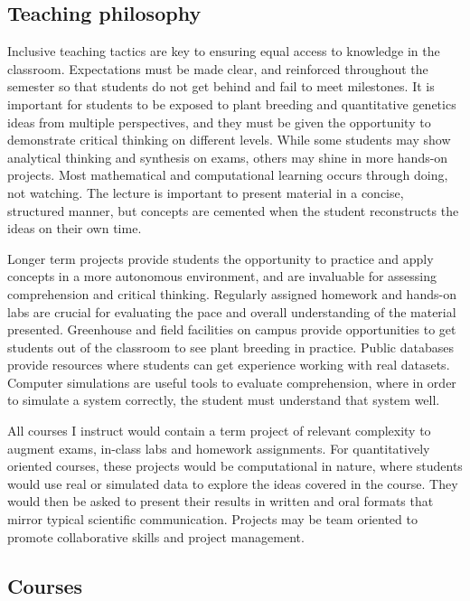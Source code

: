 \documentclass[11pt]{article}
\begin{document}
\subsection*{Teaching philosophy}

Inclusive teaching tactics are key to ensuring equal access to knowledge in the classroom. Expectations must be made clear, and reinforced throughout the semester so that students do not get behind and fail to meet milestones. It is important for students to be exposed to plant breeding and quantitative genetics ideas from multiple perspectives, and they must be given the opportunity to demonstrate critical thinking on different levels. While some students may show analytical thinking and synthesis on exams, others may shine in more hands-on projects. Most mathematical and computational learning occurs through doing, not watching. The lecture is important to present material in a concise, structured manner, but concepts are cemented when the student reconstructs the ideas on their own time.

Longer term projects provide students the opportunity to practice and apply concepts in a more autonomous environment, and are invaluable for assessing comprehension and critical thinking. Regularly assigned homework and hands-on labs are crucial for evaluating the pace and overall understanding of the material presented. Greenhouse and field facilities on campus provide opportunities to get students out of the classroom to see plant breeding in practice. Public databases provide resources where students can get experience working with real datasets. Computer simulations are useful tools to evaluate comprehension, where in order to simulate a system correctly, the student must understand that system well.

All courses I instruct would contain a term project of relevant complexity to augment exams, in-class labs and homework assignments. For quantitatively oriented courses, these projects would be computational in nature, where students would use real or simulated data to explore the ideas covered in the course. They would then be asked to present their results in written and oral formats that mirror typical scientific communication. Projects may be team oriented to promote collaborative skills and project management.

\subsection*{Courses}
\end{document}
